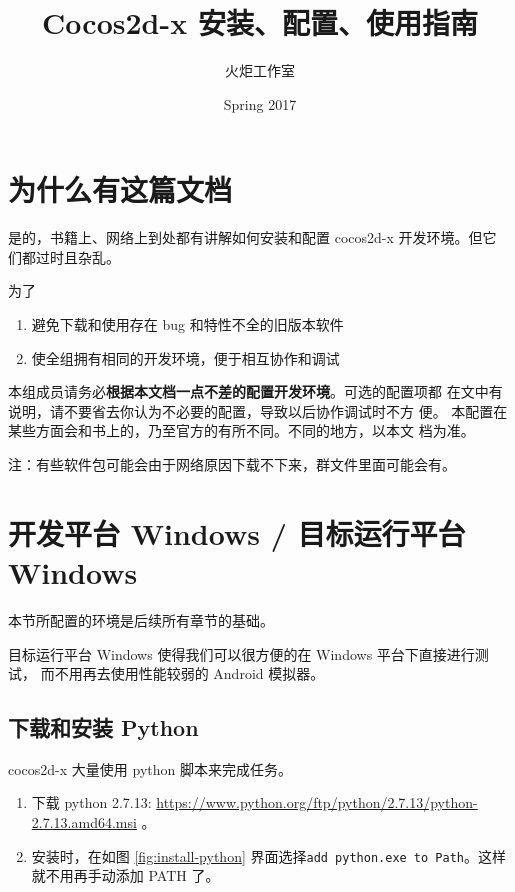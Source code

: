 \documentclass[a4paper, 10pt]{article}
\begin{document}
\title{Cocos2d-x 安装、配置、使用指南}
\author{火炬工作室}
\date{Spring 2017}

\maketitle
{}
\tableofcontents
\listoftables
\listoffigures

\section{为什么有这篇文档}

是的，书籍上、网络上到处都有讲解如何安装和配置 cocos2d-x 开发环境。但它
们都过时且杂乱。

为了

\begin{enumerate}
\item 避免下载和使用存在 bug 和特性不全的旧版本软件
\item 使全组拥有相同的开发环境，便于相互协作和调试
\end{enumerate}

本组成员请务必\textbf{根据本文档一点不差的配置开发环境}。可选的配置项都
在文中有说明，请不要省去你认为不必要的配置，导致以后协作调试时不方
便。 本配置在某些方面会和书上的，乃至官方的有所不同。不同的地方，以本文
档为准。

注：有些软件包可能会由于网络原因下载不下来，群文件里面可能会有。

\section{开发平台 Windows / 目标运行平台 Windows}

本节所配置的环境是后续所有章节的基础。

目标运行平台 Windows 使得我们可以很方便的在 Windows 平台下直接进行测试，
而不用再去使用性能较弱的 Android 模拟器。

\subsection{下载和安装 Python}

cocos2d-x 大量使用 python 脚本来完成任务。

\begin{enumerate}
\item 下载 python 2.7.13:
  \url{https://www.python.org/ftp/python/2.7.13/python-2.7.13.amd64.msi}
  。

\item 安装时，在如图 \ref{fig:install-python} 界面选择\texttt{add python.exe
  to Path}。这样就不用再手动添加 PATH 了。
\end{enumerate}
\end{document}
